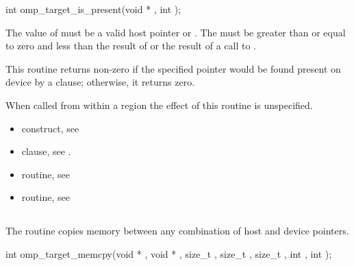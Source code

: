 \begin{ccppspecific}
\format
\begin{boxedcode}
int omp\_target\_is\_present(void * , int );
\end{boxedcode}

\constraints

The value of  must be a valid host pointer or .
The 
must be greater than or equal to zero and less than the result of
 or the result of a call to
.

\effect

This routine returns non-zero if the specified pointer
would be found present on device  by a 
clause; otherwise, it returns zero.

When called from within a  region 
the effect of this routine is unspecified.

\crossreferences
\begin{itemize}
\item {} construct, see 

\item {} clause, see .

\item {} routine, see 

\item {} routine, see 
\end{itemize}


\pagebreak
{}
\subsection{}
\label{subsec:omp_target_memcpy}
\summary

The  routine copies memory between any combination
of host and device pointers.

\format
\begin{boxedcode}
int omp\_target\_memcpy(void * , void * , size\_t ,
                        size\_t , size\_t ,
                        int , int );
\end{boxedcode}


\end{ccppspecific}

